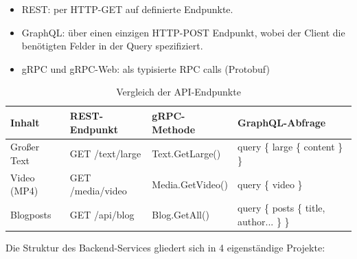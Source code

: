 \begin{itemize}
	\item REST: per HTTP-GET auf definierte Endpunkte.
	\item GraphQL: über einen einzigen HTTP-POST Endpunkt, wobei der Client die benötigten Felder in der Query spezifiziert.
	\item gRPC und gRPC-Web: als typisierte RPC calls (Protobuf) 
\end{itemize}

\begin{table}[h]
	\centering
	\caption{Vergleich der API-Endpunkte}
	\label{tab:api-comparison}
	\renewcommand{\arraystretch}{1.2}
	\setlength{\tabcolsep}{4pt}
	\small
	\begin{tabularx}{\textwidth}{|l|>{\ttfamily}l|>{\ttfamily}l|>{\ttfamily}X|}
		\hline
		\textbf{Inhalt} & \textbf{REST-Endpunkt} & \textbf{gRPC-Methode} & \textbf{GraphQL-Abfrage} \\
		\hline
		Großer Text & GET /text/large & Text.GetLarge() & query \{ large \{ content \} \} \\
		\hline
		Video (MP4) & GET /media/video & Media.GetVideo() & query \{ video \} \\
		\hline
		Blogposts & GET /api/blog & Blog.GetAll() & query \{ posts \{ title, author... \} \} \\
		\hline
	\end{tabularx}
\end{table}




Die Struktur des Backend-Services gliedert sich in 4 eigenständige Projekte:

